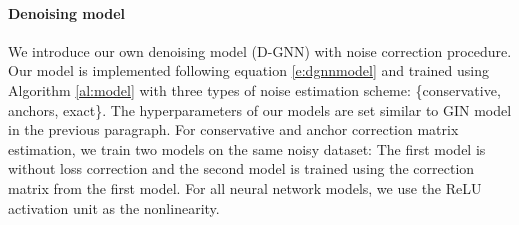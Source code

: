 \documentclass[letterpaper]{article}
\begin{document}
\begin{table}[h]
  \centering
  \caption{Classification results at symmetric noise, when $n=0.2$ (80\% data has correct labels).
  We calculate the mean and std of accuracy score on test data for 10 runs each configuration.}
  \label{tab:1}
  \begin{center}
\end{center}
\end{table}

\paragraph{Denoising model} We introduce our own denoising model (D-GNN) with 
noise correction procedure. Our model is implemented following equation 
\ref{e:dgnnmodel} and trained using Algorithm \ref{al:model}
with three types of noise estimation scheme: \{conservative, anchors, exact\}.
The hyperparameters of our models are set similar to GIN model in the previous
paragraph. For conservative and anchor correction matrix estimation, we train 
two models on the same noisy dataset: The first model is without loss correction
and the second model is trained using the correction matrix from the first model.
For all neural network models, we use the ReLU activation unit as the nonlinearity.
\end{document}
